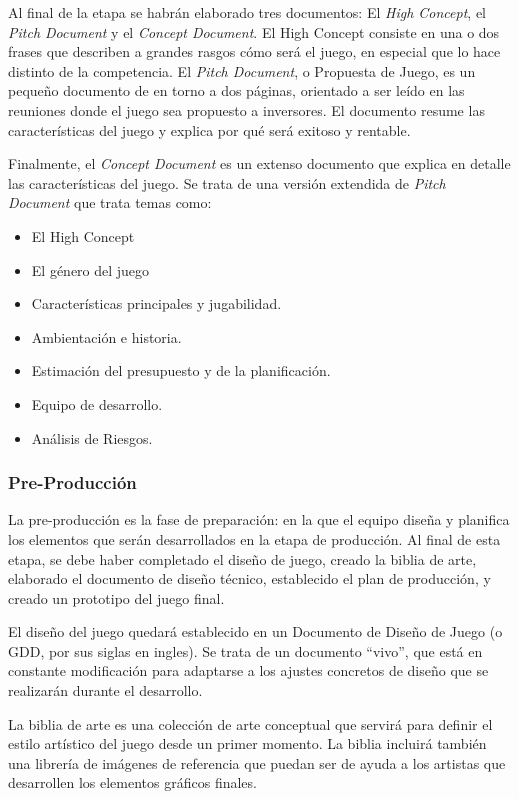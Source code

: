 Al final de la etapa se habrán elaborado tres documentos: El \textit{High Concept}, el \textit{Pitch Document} y el \textit{Concept Document}. El High Concept consiste en una o dos frases que describen a grandes rasgos cómo será el juego, en especial que lo hace distinto de la competencia. El \textit{Pitch Document}, o Propuesta de Juego, es un pequeño documento de en torno a dos páginas, orientado a ser leído en las reuniones donde el juego sea propuesto a inversores. El documento resume las características del juego y explica por qué será exitoso y rentable.

Finalmente, el \textit{Concept Document} es un extenso documento que explica en detalle las características del juego. Se trata de una versión extendida de \textit{Pitch Document} que trata temas como: 
\begin{itemize}
\item El High Concept
\item El género del juego
\item Características principales y jugabilidad.
\item Ambientación e historia.
\item Estimación del presupuesto y de la planificación.
\item Equipo de desarrollo.
\item Análisis de Riesgos.
\end{itemize}

\subsubsection{Pre-Producción}
La pre-producción es la fase de preparación: en la que el equipo diseña y planifica los elementos que serán desarrollados en la etapa de producción. Al final de esta etapa, se debe haber completado el diseño de juego, creado la biblia de arte, elaborado el documento de diseño técnico, establecido el plan de producción, y creado un prototipo del juego final\cite{game_design_2}.

El diseño del juego quedará establecido en un Documento de Diseño de Juego (o GDD, por sus siglas en ingles). Se trata de un documento ``vivo'', que está en constante modificación para adaptarse a los ajustes concretos de diseño que se realizarán durante el desarrollo.

La biblia de arte es una colección de arte conceptual que servirá para definir el estilo artístico del juego desde un primer momento. La biblia incluirá también una librería de imágenes de referencia que puedan ser de ayuda a los artistas que desarrollen los elementos gráficos finales.

